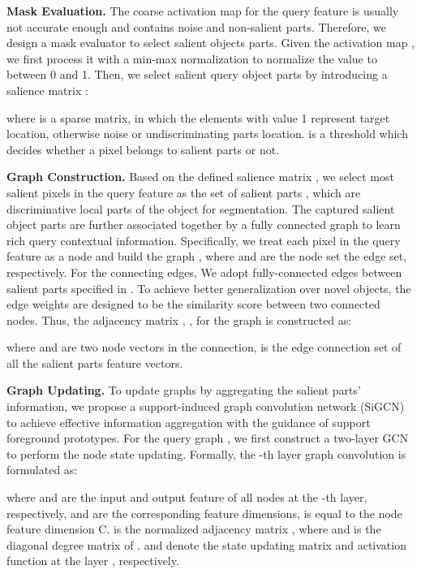 \documentclass{bmvc2k}
\begin{document}
\noindent \textbf{Mask Evaluation.}
The coarse activation map for the query feature is usually not accurate enough and contains noise and non-salient parts. Therefore, we design a mask evaluator to select salient objects parts. Given the activation map , we first process it with a min-max normalization to normalize the value to between 0 and 1.
Then, we select salient query object parts by introducing a salience matrix :

where  is a sparse matrix, in which the elements with value 1 represent target location, otherwise noise or undiscriminating parts location.  is a threshold which decides whether a pixel belongs to salient parts or not.

\noindent \textbf{Graph Construction.}
Based on the defined salience matrix , we select  most salient pixels in the query feature  as the set of salient parts , which are discriminative local parts of the object for segmentation. The captured salient object parts are further associated together by a fully connected graph to learn rich query contextual information.
Specifically, we treat each pixel in the query feature as a node and build the graph , where  and  are the node set the edge set, respectively. For the connecting edges, We adopt fully-connected edges between  salient parts specified in . To achieve better generalization over novel objects, the edge weights are designed to be the similarity score between two connected nodes. Thus, the adjacency matrix , , for the graph  is constructed as:

where  and  are two node vectors in the connection,  is the edge connection set of all the salient parts feature vectors. 


\noindent \textbf{Graph Updating.}
To update graphs by aggregating the salient parts' information, we propose a support-induced graph convolution network (SiGCN) to achieve effective information aggregation with the guidance of support foreground prototypes.
For the query graph , we first construct a two-layer GCN to perform the node state updating. Formally, the -th layer graph convolution is formulated as:

where  and   are the input and output feature of all nodes at the -th layer, respectively,   and  are the corresponding feature dimensions,  is equal to the node feature dimension C.  is the normalized adjacency matrix \cite{kipf2016semi}, where  and  is the diagonal degree matrix of .  and  denote the state updating matrix and activation function at the layer , respectively.
\end{document}
